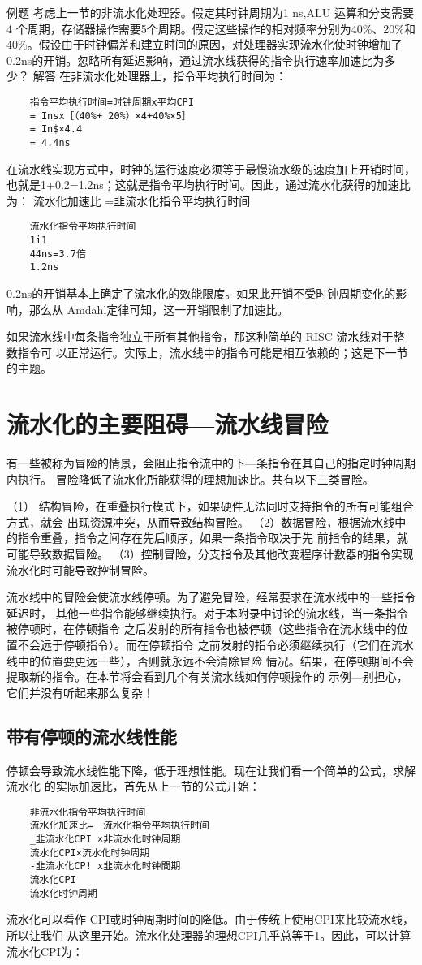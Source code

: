 例题
考虑上一节的非流水化处理器。假定其时钟周期为1 ns,ALU 运算和分支需要4
个周期，存储器操作需要5个周期。假定这些操作的相对频率分别为40\%、20\%和
40\%。假设由于时钟偏差和建立时间的原因，对处理器实现流水化使时钟增加了
0.2ns的开销。忽略所有延迟影响，通过流水线获得的指令执行速率加速比为多少？
解答
在非流水化处理器上，指令平均执行时间为：
\begin{verbatim}
    指令平均执行时间=时钟周期x平均CPI
    = Insx［（40%+ 20%）×4+40%×5］
    = In$×4.4
    = 4.4ns
\end{verbatim}
在流水线实现方式中，时钟的运行速度必须等于最慢流水级的速度加上开销时间，
也就是1+0.2=1.2ns；这就是指令平均执行时间。因此，通过流水化获得的加速比为：
流水化加速比 =韭流水化指令平均执行时间
\begin{verbatim}
    流水化指令平均执行时间
    1i1
    44ns=3.7倍
    1.2ns
\end{verbatim}
0.2ns的开销基本上确定了流水化的效能限度。如果此开销不受时钟周期变化的影
响，那么从 Amdahl定律可知，这一开销限制了加速比。

如果流水线中每条指令独立于所有其他指令，那这种简单的 RISC 流水线对于整数指令可
以正常运行。实际上，流水线中的指令可能是相互依赖的；这是下一节的主题。

\section{流水化的主要阻碍—流水线冒险}
有一些被称为冒险的情景，会阻止指令流中的下—条指令在其自己的指定时钟周期内执行。
冒险降低了流水化所能获得的理想加速比。共有以下三类冒险。

（1） 结构冒险，在重叠执行模式下，如果硬件无法同时支持指令的所有可能组合方式，就会
出现资源冲突，从而导致结构冒险。
（2）数据冒险，根据流水线中的指令重叠，指令之间存在先后顺序，如果一条指令取决于先
前指令的结果，就可能导致数据冒险。
（3）控制冒险，分支指令及其他改变程序计数器的指令实现流水化时可能导致控制冒险。

流水线中的冒险会使流水线停顿。为了避免冒险，经常要求在流水线中的一些指令延迟时，
其他一些指令能够继续执行。对于本附录中讨论的流水线，当一条指令被停顿时，在停顿指令
之后发射的所有指令也被停顿（这些指令在流水线中的位置不会远于停顿指令）。而在停顿指令
之前发射的指令必须继续执行（它们在流水线中的位置要更远一些），否则就永远不会清除冒险
情况。结果，在停顿期间不会提取新的指令。在本节将会看到几个有关流水线如何停顿操作的
示例—别担心，它们并没有听起来那么复杂！

\subsection{带有停顿的流水线性能}
停顿会导致流水线性能下降，低于理想性能。现在让我们看一个简单的公式，求解流水化
的实际加速比，首先从上一节的公式开始：
\begin{verbatim}
    非流水化指令平均执行时间
    流水化加速比=一流水化指令平均执行时间
    _韭流水化CPI ×非流水化时钟周期
    流水化CPI×流水化时钟周期
    -韭流水化CP! x韭流水化时钟間期
    流水化CPI
    流水化时钟周期
\end{verbatim}
流水化可以看作 CPI或时钟周期时间的降低。由于传统上使用CPI来比较流水线，所以让我们
从这里开始。流水化处理器的理想CPI几乎总等于1。因此，可以计算流水化CPI为：

